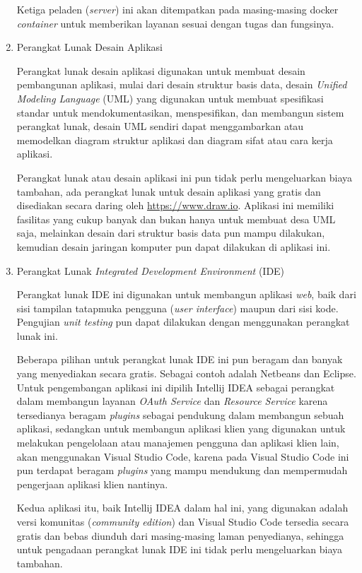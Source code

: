 \documentclass[pdftex,12pt, oneside]{article}
\begin{document}
\begin{enumerate}
Ketiga peladen (\textit{server}) ini akan ditempatkan pada masing-masing docker \textit{container} untuk memberikan layanan sesuai dengan tugas dan fungsinya.

	\item Perangkat Lunak Desain Aplikasi
	
Perangkat lunak desain aplikasi digunakan untuk membuat desain pembangunan aplikasi, mulai dari desain struktur basis data, desain \textit{Unified Modeling Language} (UML) yang digunakan untuk membuat spesifikasi standar untuk mendokumentasikan, menspesifikan, dan membangun sistem perangkat lunak, desain UML sendiri dapat menggambarkan atau memodelkan diagram struktur aplikasi dan diagram sifat atau cara kerja aplikasi.

Perangkat lunak atau desain aplikasi ini pun tidak perlu mengeluarkan biaya tambahan, ada perangkat lunak untuk desain aplikasi yang gratis dan disediakan secara daring oleh \href{https://www.draw.io}{https://www.draw.io}. Aplikasi ini memiliki fasilitas yang cukup banyak dan bukan hanya untuk membuat desa UML saja, melainkan desain dari struktur basis data pun mampu dilakukan, kemudian desain jaringan komputer pun dapat dilakukan di aplikasi ini.

	\item Perangkat Lunak \textit{Integrated Development Environment} (IDE)
	
Perangkat lunak IDE ini digunakan untuk membangun aplikasi \textit{web}, baik dari sisi tampilan tatapmuka pengguna (\textit{user interface}) maupun dari sisi kode. Pengujian \textit{unit testing} pun dapat dilakukan dengan menggunakan perangkat lunak ini.

Beberapa pilihan untuk perangkat lunak IDE ini pun beragam dan banyak yang menyediakan secara gratis. Sebagai contoh adalah Netbeans dan Eclipse. Untuk pengembangan aplikasi ini dipilih Intellij IDEA sebagai perangkat dalam membangun layanan \textit{OAuth Service} dan \textit{Resource Service} karena tersedianya beragam \textit{plugins} sebagai pendukung dalam membangun sebuah aplikasi, sedangkan untuk membangun aplikasi klien yang digunakan untuk melakukan pengelolaan atau manajemen pengguna dan aplikasi klien lain, akan menggunakan Visual Studio Code, karena pada Visual Studio Code ini pun terdapat beragam \textit{plugins} yang mampu mendukung dan mempermudah pengerjaan aplikasi klien nantinya.

Kedua aplikasi itu, baik Intellij IDEA dalam hal ini, yang digunakan adalah versi komunitas (\textit{community edition}) dan Visual Studio Code tersedia secara gratis dan bebas diunduh dari masing-masing laman penyedianya, sehingga untuk pengadaan perangkat lunak IDE ini tidak perlu mengeluarkan biaya tambahan.


\end{enumerate}
\end{document}
